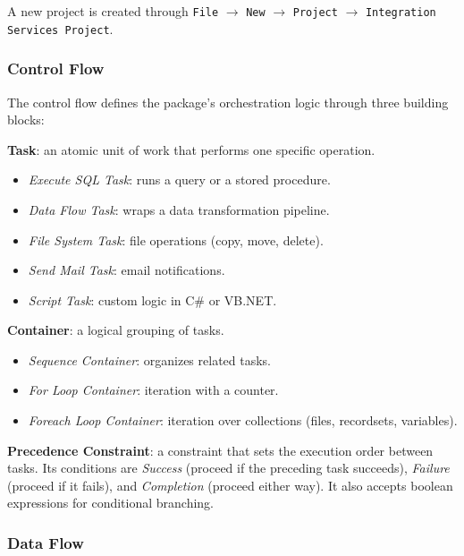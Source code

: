 A new project is created through \texttt{File} $\rightarrow$ \texttt{New} $\rightarrow$ \texttt{Project} $\rightarrow$ \texttt{Integration Services Project}.

\subsubsection{Control Flow}
\label{subsec:ssis-control-flow}

The control flow defines the package's orchestration logic through three building blocks:

\begin{examplebox}
\textbf{Task}: an atomic unit of work that performs one specific operation.
\begin{itemize}
    \item \textit{Execute SQL Task}: runs a query or a stored procedure.
    \item \textit{Data Flow Task}: wraps a data transformation pipeline.
    \item \textit{File System Task}: file operations (copy, move, delete).
    \item \textit{Send Mail Task}: email notifications.
    \item \textit{Script Task}: custom logic in C\# or VB.NET.
\end{itemize}

\textbf{Container}: a logical grouping of tasks.
\begin{itemize}
    \item \textit{Sequence Container}: organizes related tasks.
    \item \textit{For Loop Container}: iteration with a counter.
    \item \textit{Foreach Loop Container}: iteration over collections (files, recordsets, variables).
\end{itemize}

\textbf{Precedence Constraint}: a constraint that sets the execution order between tasks. Its conditions are \textit{Success} (proceed if the preceding task succeeds), \textit{Failure} (proceed if it fails), and \textit{Completion} (proceed either way). It also accepts boolean expressions for conditional branching.
\end{examplebox}

\subsubsection{Data Flow}
\label{subsec:ssis-data-flow}

